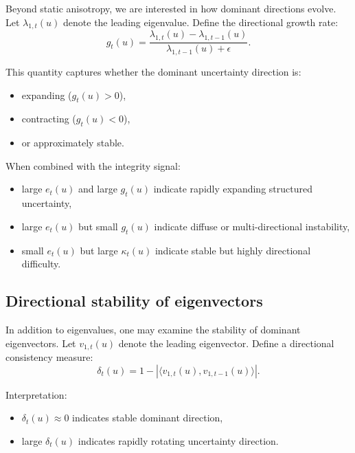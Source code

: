 \documentclass[11pt]{article}
\theoremstyle{definition}
\theoremstyle{plain}
\begin{document}
Beyond static anisotropy, we are interested in how dominant directions evolve. Let $\lambda_{1,t}(u)$ denote the leading eigenvalue. Define the directional growth rate:
\begin{equation}
g_t(u)=\frac{\lambda_{1,t}(u)-\lambda_{1,t-1}(u)}{\lambda_{1,t-1}(u)+\epsilon}.
\end{equation}

This quantity captures whether the dominant uncertainty direction is:
\begin{itemize}[leftmargin=1.5em]
    \item expanding ($g_t(u)>0$),
    \item contracting ($g_t(u)<0$),
    \item or approximately stable.
\end{itemize}

When combined with the integrity signal:
\begin{itemize}[leftmargin=1.5em]
    \item large $e_t(u)$ and large $g_t(u)$ indicate rapidly expanding structured uncertainty,
    \item large $e_t(u)$ but small $g_t(u)$ indicate diffuse or multi-directional instability,
    \item small $e_t(u)$ but large $\kappa_t(u)$ indicate stable but highly directional difficulty.
\end{itemize}


\subsection{Directional stability of eigenvectors}

In addition to eigenvalues, one may examine the stability of dominant eigenvectors. Let $v_{1,t}(u)$ denote the leading eigenvector. Define a directional consistency measure:
\begin{equation}
\delta_t(u)=1-\left|\langle v_{1,t}(u), v_{1,t-1}(u)\rangle\right|.
\end{equation}

Interpretation:
\begin{itemize}[leftmargin=1.5em]
    \item $\delta_t(u)\approx 0$ indicates stable dominant direction,
    \item large $\delta_t(u)$ indicates rapidly rotating uncertainty direction.
\end{itemize}
\end{document}
